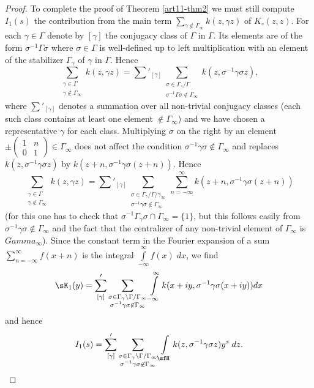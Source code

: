 \begin{proof}
To complete the proof of Theorem \ref{art11-thm2} we must still compute $I_1 (s)$ \ie the contribution from the main term $\sum\limits_{\gamma \not\in \Gamma_\infty} k (z, \gamma z)$ of $K_\circ (z,z)$. For each $\gamma \in \Gamma$ denote by $[\gamma]$ the conjugacy class of $\Gamma$ in $\Gamma$. Its elements are of the form $\sigma^{-1} \Gamma \sigma$ where $\sigma \in \Gamma$ is well-defined up to left multiplication with an element of the stabilizer $\Gamma_\gamma$ of $\gamma$ in $\Gamma$. Hence 
$$
\sum\limits_{\substack{\gamma \in \Gamma \\ \gamma \not\in \Gamma_\infty}} k (z, \gamma z) = \sum\limits'_{[\gamma]} \sum\limits_{\substack{\sigma \in \Gamma_\gamma / \Gamma \\ \sigma^{-1} \Gamma \sigma \not\in \Gamma_\infty}} k (z, \sigma^{-1} \gamma \sigma z), 
$$
where $\sum\limits'_{[\gamma]}$ denotes a summation over all non-trivial conjugacy classes (each such class contains at least one element $\not\in\Gamma_\infty$) and we have chosen a representative $\gamma$ for each class. Multiplying $\sigma $ on the right by an element $\pm
\left(\begin{matrix}
1 & n \\
0 & 1
\end{matrix} \right) \in \Gamma_\infty$ does not affect the condition $\sigma^{-1} \gamma \sigma \not\in \Gamma_\infty$ and replaces $k(z, \sigma^{-1} \gamma \sigma z)$ by $k(z+ n, \sigma^{-1} \gamma \sigma (z+n))$. Hence 
$$
\sum\limits_{\substack{\gamma \in \Gamma\\ \gamma \not\in \Gamma_\infty}} k (z, \gamma z) = \sum\limits'_{[\gamma]} \sum\limits_{\substack{\sigma \in \Gamma_\gamma / \Gamma / \gamma_\infty\\\sigma^{-1} \gamma \sigma \not\in \Gamma_\infty}} \sum\limits^\infty_{n=-\infty} k (z + n, \sigma^{-1} \gamma \sigma (z+n))
$$
(for this one has to check that $\sigma^{-1} \Gamma_\gamma \sigma \cap \Gamma_\infty =\{1\}$, but this follows easily from $\sigma^{-1} \gamma \sigma \not\in \Gamma_\infty$ and the fact that the centralizer of any non-trivial element of $\Gamma_\infty$ is $Gamma_\infty$). Since the constant term in the Fourier expansion of a sum $\sum\limits^\infty_{n = - \infty} f(x + n)$ is the integral $\int\limits^\infty_{-\infty} f(x) \; dx$, we find 
$$
\sK_1 (y) =\sum\limits'_{[\gamma]} \sum\limits_{\substack{\sigma \in \Gamma_\gamma \backslash \Gamma / \Gamma_\infty\\ \sigma^{-1} \gamma \sigma \not\in \Gamma_\infty}} \int\limits^\infty_{-\infty} k(x+ iy, \sigma^{-1} \gamma \sigma (x+ iy)) dx 
$$\pageoriginale
and hence 
$$
I_1 (s) = \sum\limits'_{[\gamma]}  \sum\limits_{\substack{\sigma \in \Gamma_\gamma \backslash \Gamma / \Gamma_\infty\\ \sigma^{-1} \gamma \sigma \not\in \Gamma_\infty}}
\int\limits_{\sfH} k (z, \sigma^{-1} \gamma \sigma z) y^s \; d z. 
$$


\end{proof}
